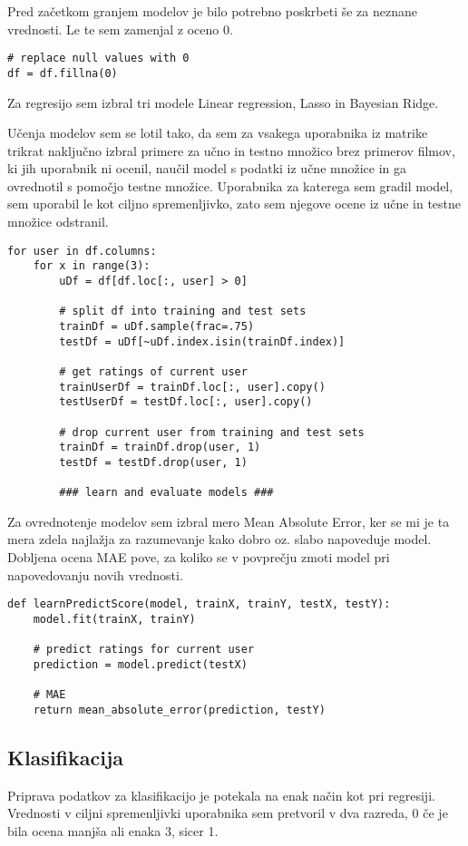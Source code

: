 \documentclass[a4paper,11pt]{article}
\begin{document}
Pred začetkom granjem modelov je bilo potrebno poskrbeti še za neznane vrednosti.
Le te sem zamenjal z oceno 0.

\begin{lstlisting}
# replace null values with 0
df = df.fillna(0)
\end{lstlisting}

Za regresijo sem izbral tri modele Linear regression, Lasso in Bayesian Ridge.

Učenja modelov sem se lotil tako, da sem za vsakega uporabnika iz matrike trikrat
naključno izbral primere za učno in testno množico brez primerov filmov, ki jih
uporabnik ni ocenil, naučil model s podatki iz učne množice in ga ovrednotil s 
pomočjo testne množice. Uporabnika za katerega sem gradil model, sem uporabil le 
kot ciljno spremenljivko, zato sem njegove ocene iz učne in testne množice odstranil.

\begin{lstlisting}
for user in df.columns:
    for x in range(3):
        uDf = df[df.loc[:, user] > 0]

        # split df into training and test sets
        trainDf = uDf.sample(frac=.75)
        testDf = uDf[~uDf.index.isin(trainDf.index)]

        # get ratings of current user
        trainUserDf = trainDf.loc[:, user].copy()
        testUserDf = testDf.loc[:, user].copy()

        # drop current user from training and test sets
        trainDf = trainDf.drop(user, 1)
        testDf = testDf.drop(user, 1)
        
        ### learn and evaluate models ###
\end{lstlisting}

Za ovrednotenje modelov sem izbral mero Mean Absolute Error, ker se mi je ta
mera zdela najlažja za razumevanje kako dobro oz. slabo napoveduje model.
Dobljena ocena MAE pove, za koliko se v povprečju zmoti model pri napovedovanju
novih vrednosti.

\begin{lstlisting}
def learnPredictScore(model, trainX, trainY, testX, testY):
    model.fit(trainX, trainY)

    # predict ratings for current user
    prediction = model.predict(testX)

    # MAE
    return mean_absolute_error(prediction, testY)
\end{lstlisting}


\subsection{Klasifikacija}
Priprava podatkov za klasifikacijo je potekala na enak način kot pri regresiji. Vrednosti v ciljni 
spremenljivki uporabnika sem pretvoril v dva razreda, 0 če je bila ocena manjša ali enaka 3, sicer 1.
\end{document}
